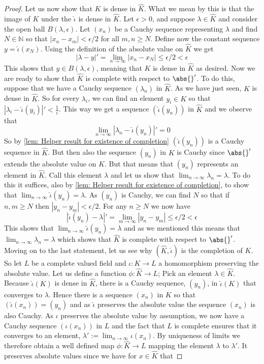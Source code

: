 \documentclass{article}
\newcommand{\mbb}[1]{\mathbb{#1}}
\numberwithin{equation}{section}
\begin{document}
\begin{proof}
    Let us now show that $K$ is dense in $\hat K$. What we mean by this is that the image of $K$ under the $\hat \iota$ is dense in $\hat K$. Let $\epsilon > 0$, and suppose $\lambda \in \hat K$ and consider the open ball $B(\lambda, \epsilon)$. Let $(x_n)$ be a Cauchy sequence representing $\lambda$ and find $N \in \mbb N$ so that $|x_n - x_m| < \epsilon / 2$ for all $m,n \geq N$. Define now the constant sequence $y = \hat \iota (x_N)$. Using the definition of the absolute value on $\hat K$ we get
    $$|\lambda - y|' = \lim_{n \to \infty} |x_n - x_N| \leq \epsilon/2 < \epsilon$$
    This shows that $y \in B(\lambda, \epsilon)$, meaning that $K$ is dense in $\hat K$ as desired. Now we are ready to show that $\hat K$ is complete with respect to $\abs{}'$. To do this, suppose that we have a Cauchy sequence $(\lambda_n)$ in $\hat K$. As we have just seen, $K$ is dense in $\hat K$. So for every $\lambda_i$, we can find an element $y_i \in K$ so that $|\lambda_i - \hat \iota (y_i)|' < \frac{1}{i}$. This way we get a sequence $(\hat \iota (y_n))$ in $\hat K$ and we observe that
    $$\lim_{n \to \infty} |\lambda_n - \hat \iota(y_n)|' = 0$$
    So by \cref{lem: Helper result for existence of completion} $(\hat \iota (y_n))$ is a Cauchy sequence in $\hat K$. But then also the sequence $(y_n)$ in $K$ is Cauchy since $\abs{}'$ extends the absolute value on $K$. But that means that $(y_n)$ represents an element in $\hat K$. Call this element $\lambda$ and let us show that $\lim_{n \to \infty} \lambda_n = \lambda$. To do this it suffices, also by \cref{lem: Helper result for existence of completion}, to show that $\lim_{n \to \infty} \hat \iota (y_n) = \lambda$. As $(y_n)$ is Cauchy, we can find $N$ so that if $n,m \geq N$ then $|y_n - y_m| < \epsilon / 2$. For any $n \geq N$ we now have
    $$|\hat \iota (y_n) - \lambda|' = \lim_{m \to \infty} |y_n - y_m| \leq \epsilon / 2 < \epsilon$$
    This shows that $\lim_{n \to \infty} \hat \iota (y_n) = \lambda$ and as we mentioned this means that $\lim_{n \to \infty} \lambda_n = \lambda$
    which shows that $\hat K$ is complete with respect to $\abs{}'$. Moving on to the last statement, let us see why $(\hat K, \hat \iota)$ is the completion of $K$. So let $L$ be a complete valued field and $\iota : K \to L$ a homomorphism preserving the absolute value. Let us define a function $\phi : \hat K \to L$; Pick an element $\lambda \in \hat K$. Because $\hat \iota (K)$ is dense in $\hat K$, there is a Cauchy sequence, $(y_n)$, in $\hat \iota (K)$ that converges to $\lambda$. Hence there is a sequence $(x_n)$ in $K$ so that $(\hat \iota(x_n)) = (y_n)$ and as $\hat \iota$ preserves the absolute value the sequence $(x_n)$ is also Cauchy. As $\iota$ preserves the absolute value by assumption, we now have a Cauchy sequence $(\iota(x_n))$ in $L$ and the fact that $L$ is complete ensures that it converges to an element, $\lambda' := \lim_{n \to \infty} \iota(x_n)$. By uniqueness of limits we therefore obtain a well defined map $\phi : \hat K \to L$ mapping the element $\lambda$ to $\lambda'$. It preserves absolute values since we have for $x \in \hat K$ that

\end{proof}
\end{document}
